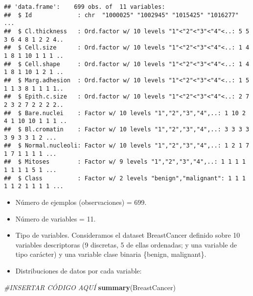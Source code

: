 \documentclass[]{article}
\newenvironment{Shaded}{\begin{snugshade}}{\end{snugshade}}
\newcommand{\CommentTok}[1]{\textcolor[rgb]{0.56,0.35,0.01}{\textit{#1}}}
\newcommand{\KeywordTok}[1]{\textcolor[rgb]{0.13,0.29,0.53}{\textbf{#1}}}
\newcommand{\NormalTok}[1]{#1}
\begin{document}
\begin{verbatim}
## 'data.frame':    699 obs. of  11 variables:
##  $ Id             : chr  "1000025" "1002945" "1015425" "1016277" ...
##  $ Cl.thickness   : Ord.factor w/ 10 levels "1"<"2"<"3"<"4"<..: 5 5 3 6 4 8 1 2 2 4..
##  $ Cell.size      : Ord.factor w/ 10 levels "1"<"2"<"3"<"4"<..: 1 4 1 8 1 10 1 1 1 ..
##  $ Cell.shape     : Ord.factor w/ 10 levels "1"<"2"<"3"<"4"<..: 1 4 1 8 1 10 1 2 1 ..
##  $ Marg.adhesion  : Ord.factor w/ 10 levels "1"<"2"<"3"<"4"<..: 1 5 1 1 3 8 1 1 1 1..
##  $ Epith.c.size   : Ord.factor w/ 10 levels "1"<"2"<"3"<"4"<..: 2 7 2 3 2 7 2 2 2 2..
##  $ Bare.nuclei    : Factor w/ 10 levels "1","2","3","4",..: 1 10 2 4 1 10 10 1 1 1 ..
##  $ Bl.cromatin    : Factor w/ 10 levels "1","2","3","4",..: 3 3 3 3 3 9 3 3 1 2 ...
##  $ Normal.nucleoli: Factor w/ 10 levels "1","2","3","4",..: 1 2 1 7 1 7 1 1 1 1 ...
##  $ Mitoses        : Factor w/ 9 levels "1","2","3","4",..: 1 1 1 1 1 1 1 1 5 1 ...
##  $ Class          : Factor w/ 2 levels "benign","malignant": 1 1 1 1 1 2 1 1 1 1 ...
\end{verbatim}

\begin{itemize}
\item
  Número de ejemplos (observaciones) = 699.
\item
  Número de variables = 11.
\item
  Tipo de variables. Consideramos el dataset BreastCancer definido sobre
  10 variables descriptoras (9 discretas, 5 de ellas ordenadas; y una
  variable de tipo carácter) y una variable clase binaria \{benign,
  malignant\}.
\item
  Distribuciones de datos por cada variable:
\end{itemize}

\begin{Shaded}
\begin{Highlighting}[]
\CommentTok{#INSERTAR CÓDIGO AQUÍ}
\KeywordTok{summary}\NormalTok{(BreastCancer)}
\end{Highlighting}
\end{Shaded}
\end{document}
